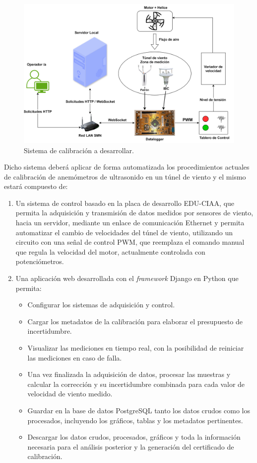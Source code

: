 \begin{figure}[H]
    \centering
    \includegraphics[width=1\linewidth]{Figuras/introduccion/sistemaDesarrollado.png}
    \caption{Sistema de calibración a desarrollar.} 
    \label{fig:sistemaDesarrollado}
\end{figure}

Dicho sistema deberá aplicar de forma automatizada los procedimientos actuales de calibración de anemómetros de ultrasonido en un túnel de viento y el mismo estará compuesto de:
\begin{enumerate}
    \item Un sistema de control basado en la placa de desarrollo EDU-CIAA, que permita la adquisición y transmisión de datos medidos por sensores de viento, hacia un servidor, mediante un enlace de comunicación Ethernet y permita automatizar el cambio de velocidades del túnel de viento, utilizando un circuito con una señal de control PWM, que reemplaza el comando manual que regula la velocidad del motor, actualmente controlada con potenciómetros.
     
    \item Una aplicación web desarrollada con el \textit{framework} Django en Python que permita:
    \begin{itemize}
        \item Configurar los sistemas de adquisición y control.
        \item Cargar los metadatos de la calibración para elaborar el presupuesto de incertidumbre.
        \item Visualizar las mediciones en tiempo real, con la posibilidad de reiniciar las mediciones en caso de falla.
        \item Una vez finalizada la adquisición de datos, procesar las muestras y calcular la corrección y su incertidumbre combinada para cada valor de velocidad de viento medido.
        \item Guardar en la base de datos PostgreSQL tanto los datos crudos como los procesados, incluyendo los gráficos, tablas y los metadatos pertinentes.
        \item Descargar los datos crudos, procesados, gráficos y toda la información necesaria para el análisis posterior y la generación del certificado de calibración.
    \end{itemize}
\end{enumerate}
